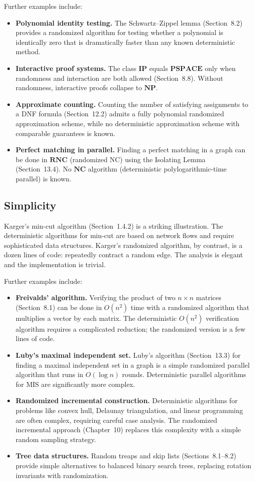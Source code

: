 \documentclass[twoside,12pt]{book}
\theoremstyle{plain}
\theoremstyle{definition}
\theoremstyle{remark}
\begin{document}
Further examples include:
\begin{itemize}
\item \textbf{Polynomial identity testing.} The Schwartz--Zippel lemma
(Section~8.2) provides a randomized algorithm for testing whether a
polynomial is identically zero that is dramatically faster than any
known deterministic method.
\item \textbf{Interactive proof systems.} The class $\mathbf{IP}$ equals
$\mathbf{PSPACE}$ only when randomness and interaction are both allowed
(Section~8.8). Without randomness, interactive proofs collapse to
$\mathbf{NP}$.
\item \textbf{Approximate counting.} Counting the number of satisfying
assignments to a DNF formula (Section~12.2) admits a fully polynomial
randomized approximation scheme, while no deterministic approximation
scheme with comparable guarantees is known.
\item \textbf{Perfect matching in parallel.} Finding a perfect matching
in a graph can be done in $\mathbf{RNC}$ (randomized NC) using the
Isolating Lemma (Section~13.4). No $\mathbf{NC}$ algorithm (deterministic
polylogarithmic-time parallel) is known.
\end{itemize}

\subsection{Simplicity}

Karger's min-cut algorithm (Section~1.4.2) is a striking illustration. The
deterministic algorithms for min-cut are based on network flows and require
sophisticated data structures. Karger's randomized algorithm, by contrast,
is a dozen lines of code: repeatedly contract a random edge. The analysis
is elegant and the implementation is trivial.

Further examples include:
\begin{itemize}
\item \textbf{Freivalds' algorithm.} Verifying the product of two $n
\times n$ matrices (Section~8.1) can be done in $O(n^2)$ time with a
randomized algorithm that multiplies a vector by each matrix. The
deterministic $O(n^2)$ verification algorithm requires a complicated
reduction; the randomized version is a few lines of code.
\item \textbf{Luby's maximal independent set.} Luby's algorithm
(Section~13.3) for finding a maximal independent set in a graph is a
simple randomized parallel algorithm that runs in $O(\log n)$ rounds.
Deterministic parallel algorithms for MIS are significantly more complex.
\item \textbf{Randomized incremental construction.} Deterministic
algorithms for problems like convex hull, Delaunay triangulation, and
linear programming are often complex, requiring careful case analysis.
The randomized incremental approach (Chapter~10) replaces this complexity
with a simple random sampling strategy.
\item \textbf{Tree data structures.} Random treaps and skip lists
(Sections~8.1--8.2) provide simple alternatives to balanced binary search
trees, replacing rotation invariants with randomization.
\end{itemize}
\end{document}
